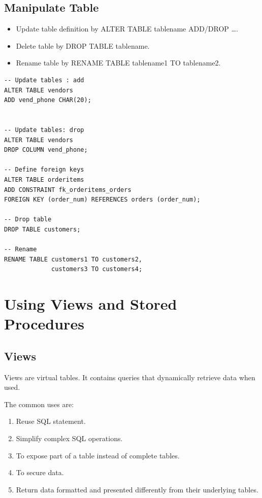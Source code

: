 \documentclass[12pt,oneside,a4paper]{article}
\begin{document}
\subsection{Manipulate Table}

\begin{itemize}
\item Update table definition by \textsf{ALTER TABLE tablename ADD/DROP \ldots}. 

\item Delete table by \textsf{DROP TABLE tablename}.

\item Rename table by \textsf{RENAME TABLE tablename1 TO tablename2}.
\end{itemize}

\begin{lstlisting}
-- Update tables : add 
ALTER TABLE vendors 
ADD vend_phone CHAR(20);


-- Update tables: drop 
ALTER TABLE vendors 
DROP COLUMN vend_phone;

-- Define foreign keys 
ALTER TABLE orderitems 
ADD CONSTRAINT fk_orderitems_orders
FOREIGN KEY (order_num) REFERENCES orders (order_num);

-- Drop table 
DROP TABLE customers;

-- Rename 
RENAME TABLE customers1 TO customers2,
             customers3 TO customers4;

\end{lstlisting}
\section{Using Views and Stored Procedures}
\subsection{Views}
Views are virtual tables. It contains queries that dynamically retrieve data when used. 

The common uses are: 
\begin{enumerate}
\item Reuse SQL statement. 
\item Simplify complex SQL operations. 
\item To expose part of a table instead of complete tables. 
\item To secure data.
\item Return data formatted and presented differently from their underlying tables. 
\end{enumerate}
\end{document}
